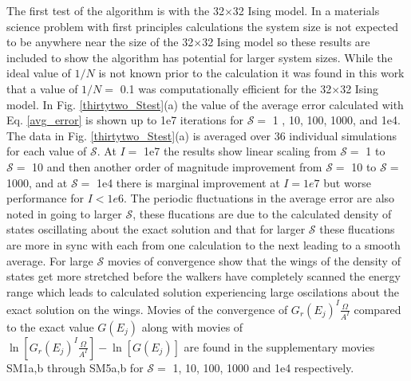 \documentclass[aps,pre,reprint,superscriptaddress,showkeys]{revtex4-2}
\begin{document}
The first test of the algorithm is with the 32$\times$32 Ising model. In a materials science problem with first principles calculations the system size is not expected to be anywhere near the size of the  32$\times$32 Ising model so these results are included to show the algorithm has potential for larger system sizes. While the ideal value of $1/N$ is not known prior to the calculation it was found in this work that a value of $1/N=$ 0.1 was computationally efficient for the 32$\times$32 Ising model. In Fig. \ref{thirtytwo_Stest}(a) the value of the average error calculated with Eq. \ref{avg_error} is shown up to 1e7 iterations for $\mathcal{S}=$ 1 , 10, 100, 1000, and 1e4. The data in Fig. \ref{thirtytwo_Stest}(a) is averaged over 36 individual simulations for each value of $\mathcal{S}$. At $I=$ 1e7 the results show linear scaling from $\mathcal{S}=$ 1 to $\mathcal{S}=$ 10 and then another order of magnitude improvement from $\mathcal{S}=$ 10 to $\mathcal{S}=$ 1000, and at $\mathcal{S}=$ 1e4 there is marginal improvement at $I=1e7$ but worse performance for $I<1e6$.  The periodic fluctuations in the average error are also noted in going to larger $\mathcal{S}$, these flucations are due to the calculated density of states oscillating about the exact solution and that for larger $\mathcal{S}$  these flucations are more in sync with each from one calculation to the next leading to a smooth average. For large $\mathcal{S}$ movies of convergence show that the wings of the density of states get more stretched before the walkers have completely scanned the energy range which leads to calculated solution experiencing large oscilations about the exact solution on the wings. Movies of the convergence of $G_r(E_j)^I\frac{\Omega}{A^I}$ compared to the exact value $G(E_j)$ along with movies of $\ln[G_r(E_j)^I\frac{\Omega}{A^I}] - \ln[G(E_j)]$ are found in the supplementary movies SM1a,b through SM5a,b for $\mathcal{S}=$ 1, 10, 100, 1000 and 1e4 respectively.  
\end{document}
